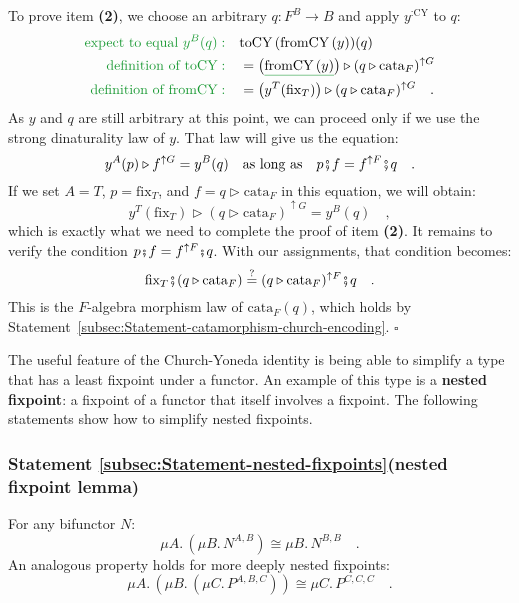 To prove item \textbf{(2)}, we choose an arbitrary $q:F^{B}\rightarrow B$
and apply $y^{:\text{CY}}$ to $q$:
\begin{align*}
{\color{greenunder}\text{expect to equal }y^{B}(q):}\quad & \text{toCY}\,(\text{fromCY}\,(y))(q)\\
{\color{greenunder}\text{definition of }\text{toCY}:}\quad & =\big(\gunderline{\text{fromCY}\,(y)}\big)\triangleright(q\triangleright\text{cata}_{F})^{\uparrow G}\\
{\color{greenunder}\text{definition of }\text{fromCY}:}\quad & =\big(y^{T}(\text{fix}_{T})\big)\triangleright(q\triangleright\text{cata}_{F})^{\uparrow G}\quad.
\end{align*}
As $y$ and $q$ are still arbitrary at this point, we can proceed
only if we use the strong dinaturality law of $y$. That law will
give us the equation:
\[
y^{A}(p)\triangleright f^{\uparrow G}=y^{B}(q)\quad\text{as long as}\quad p\bef f=f^{\uparrow F}\bef q\quad.
\]
If we set $A=T$, $p=\text{fix}_{T}$, and $f=q\triangleright\text{cata}_{F}$
in this equation, we will obtain:
\[
y^{T}(\text{fix}_{T})\triangleright(q\triangleright\text{cata}_{F})^{\uparrow G}=y^{B}(q)\quad,
\]
which is exactly what we need to complete the proof of item \textbf{(2)}.
It remains to verify the condition $p\bef f=f^{\uparrow F}\bef q$.
With our assignments, that condition becomes:
\[
\text{fix}_{T}\bef(q\triangleright\text{cata}_{F})\overset{?}{=}(q\triangleright\text{cata}_{F})^{\uparrow F}\bef q\quad.
\]
This is the $F$-algebra morphism law of $\text{cata}_{F}(q)$, which
holds by Statement~\ref{subsec:Statement-catamorphism-church-encoding}.
$\square$

The useful feature of the Church-Yoneda identity is being able to
simplify a type that has a least fixpoint under a functor. An example
of this type is a \textbf{nested fixpoint}:
a fixpoint of a functor that itself involves a fixpoint. The following
statements show how to simplify nested fixpoints.

\subsubsection{Statement \label{subsec:Statement-nested-fixpoints}\ref{subsec:Statement-nested-fixpoints}(nested
fixpoint lemma)}

For any bifunctor $N$:
\[
\mu A.\,(\mu B.\,N^{A,B})\cong\mu B.\,N^{B,B}\quad.
\]
An analogous property holds for more deeply nested fixpoints:
\[
\mu A.\,(\mu B.\,(\mu C.\,P^{A,B,C}))\cong\mu C.\,P^{C,C,C}\quad.
\]


